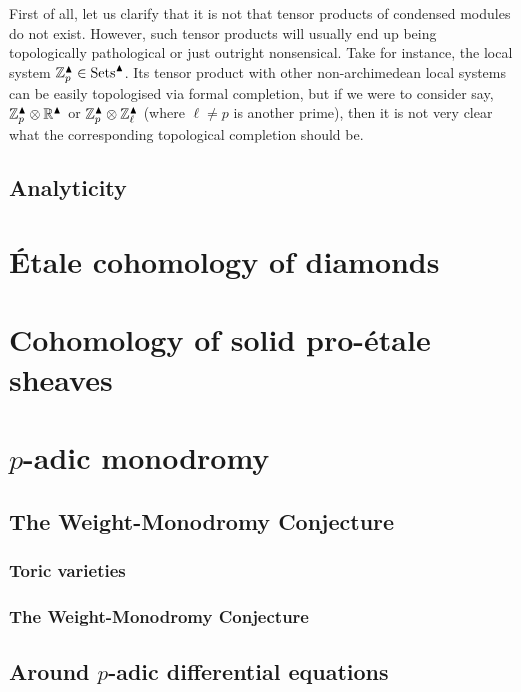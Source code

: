             First of all, let us clarify that it is not that tensor products of condensed modules do not exist. However, such tensor products will usually end up being topologically pathological or just outright nonsensical. Take for instance, the local system $\mathbb{Z}_p^{\blacktriangle} \in \mathrm{Sets}^{\blacktriangle}$. Its tensor product with other non-archimedean local systems can be easily topologised via formal completion, but if we were to consider say, $\Z_p^{\cond} \tensor \R^{\cond}$ or $\Z_p^{\cond} \tensor \Z_{\ell}^{\cond}$ (where $\ell \not = p$ is another prime), then it is not very clear what the corresponding topological completion should be.  
            
        \subsection{Analyticity}
    
    \section{\'Etale cohomology of diamonds}
    
    \section{Cohomology of solid pro-\'etale sheaves}
        
    \section{\texorpdfstring{$p$}{}-adic monodromy}
        \subsection{The Weight-Monodromy Conjecture}
            \subsubsection{Toric varieties}
            
            \subsubsection{The Weight-Monodromy Conjecture}
            
        \subsection{Around \texorpdfstring{$p$}{}-adic differential equations}